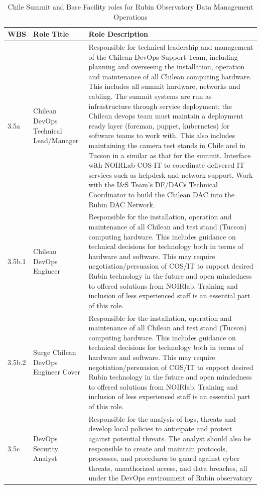 \normalsize \begin{longtable} {|p{}|p{}|p{}|} \caption{Chile Summit and Base Facility roles for Rubin Observatory Data Management Operations \label{tab:chdfroles}}\\ 
\hline 
\textbf{WBS}&\textbf{Role Title}&\textbf{Role Description} \\ \hline
{3.5a}&{Chilean DevOps Technical Lead/Manager}&{Responsible for technical leadership and management of the Chilean DevOps Support Team, including planning and overseeing the installation, operation and maintenance of all Chilean computing hardware. This includes all summit hardware, networks and cabling. The summit systems are run as infrastructure through service deployment; the Chilean devops team must maintain a deployment ready layer (foreman, puppet, kubernetes) for software teams to work with. This also includes maintaining the camera test stands in Chile and in Tucson in a similar as that for the summit. Interface with NOIRLab COS-IT to coordinate delivered IT services such as helpdesk and network support. Work with the I\&S Team's DF/DACs Technical Coordinator to build the Chilean DAC into the Rubin DAC Network.} \\ \hline
{3.5b.1}&{Chilean DevOps Engineer}&{Responsible for the installation, operation and maintenance of all Chilean and test stand (Tucson) computing hardware. This includes guidance on technical decisions for technology both in terms of hardware and software. This may require negotiation/persuasion of COS/IT to support desired Rubin technology in the future and open mindedness to offered solutions from NOIRlab. Training and inclusion of less experienced staff is an essential part of this role.} \\ \hline
{3.5b.2}&{Surge Chilean DevOps Engineer Cover}&{Responsible for the installation, operation and maintenance of all Chilean and test stand (Tucson) computing hardware. This includes guidance on technical decisions for technology both in terms of hardware and software. This may require negotiation/persuasion of COS/IT to support desired Rubin technology in the future and open mindedness to offered solutions from NOIRlab. Training and inclusion of less experienced staff is an essential part of this role.} \\ \hline
{3.5c}&{DevOps Security Analyst}&{Responsible for the analysis of logs, threats and develop local policies to anticipate and protect against potential threats. The analyst should also be responsible to create and maintain protocols, processes, and procedures to guard against cyber threats, unauthorized access, and data breaches, all under the DevOps environment of Rubin observatory} \\ \hline
\end{longtable} \normalsize
